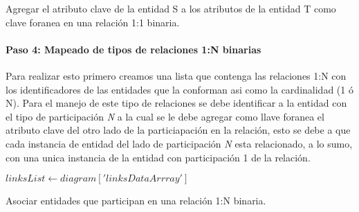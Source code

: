 \begin{algorithm}[H]

  \caption{Agregar el atributo clave de la entidad S a los atributos de la entidad T como clave foranea en una relación 1:1 binaria.}
\end{algorithm}

\paragraph*{Paso 4: Mapeado de tipos de relaciones 1:N binarias}

Para realizar esto primero creamos una lista que contenga las relaciones 1:N con los identificadores de las entidades que la conforman asi como la cardinalidad (1 ó N). Para el manejo de este tipo de relaciones se debe identificar a la entidad con el tipo de participación \textit{N} a la cual se le debe agregar como llave foranea el atributo clave del otro lado de la particiapación en la relación, esto se debe a que cada instancia de entidad del lado de participación \textit{N} esta relacionado, a lo sumo, con una unica instancia de la entidad con participación 1 de la relación.

\begin{algorithm}[H]

  $linksList \gets diagram['linksDataArrray']$\\
  \caption{Asociar entidades que participan en una relación 1:N binaria.}
\end{algorithm}

